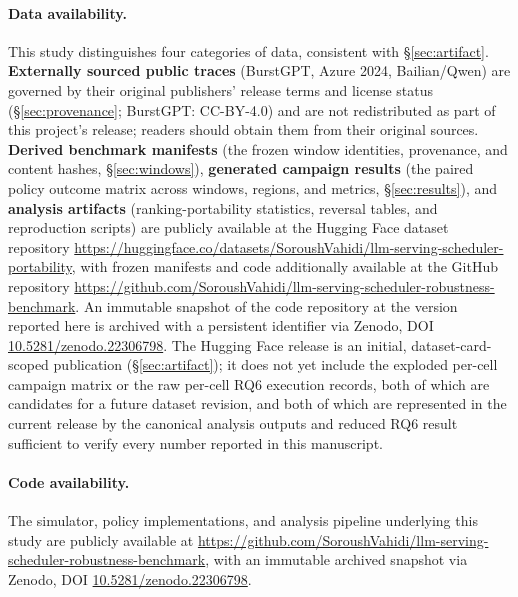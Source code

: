 \documentclass[sn-basic,Numbered,pdflatex]{sn-jnl}
\begin{document}
\paragraph{Data availability.} This study distinguishes four categories of
data, consistent with \S\ref{sec:artifact}. \textbf{Externally sourced
public traces} (BurstGPT, Azure 2024, Bailian/Qwen) are governed by their
original publishers' release terms and license status
(\S\ref{sec:provenance}; BurstGPT: CC-BY-4.0) and are not redistributed as
part of this project's release; readers should obtain them from their
original sources. \textbf{Derived benchmark manifests} (the frozen window
identities, provenance, and content hashes, \S\ref{sec:windows}),
\textbf{generated campaign results} (the paired policy outcome matrix
across windows, regions, and metrics, \S\ref{sec:results}), and
\textbf{analysis artifacts} (ranking-portability statistics, reversal
tables, and reproduction scripts) are publicly available at the Hugging
Face dataset repository
\url{https://huggingface.co/datasets/SoroushVahidi/llm-serving-scheduler-portability},
with frozen manifests and code additionally available at the GitHub
repository
\url{https://github.com/SoroushVahidi/llm-serving-scheduler-robustness-benchmark}.
An immutable snapshot of the code repository at the version reported here
is archived with a persistent identifier via Zenodo, DOI
\href{https://doi.org/10.5281/zenodo.22306798}{10.5281/zenodo.22306798}.
The Hugging Face release is an initial, dataset-card-scoped publication
(\S\ref{sec:artifact}); it does not yet include the exploded per-cell
campaign matrix or the raw per-cell RQ6 execution records, both of which
are candidates for a future dataset revision, and both of which are
represented in the current release by the canonical analysis outputs and
reduced RQ6 result sufficient to verify every number reported in this
manuscript.

\paragraph{Code availability.} The simulator, policy implementations, and
analysis pipeline underlying this study are publicly available at
\url{https://github.com/SoroushVahidi/llm-serving-scheduler-robustness-benchmark},
with an immutable archived snapshot via Zenodo, DOI
\href{https://doi.org/10.5281/zenodo.22306798}{10.5281/zenodo.22306798}.



\end{document}
